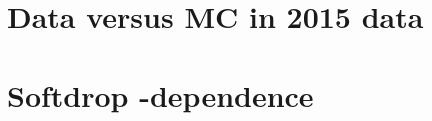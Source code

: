 \chapter{Data versus MC in 2015 data}
\label{app:datamc2015}

\chapter{Softdrop \PT-dependence}
\label{app:sdptdep}